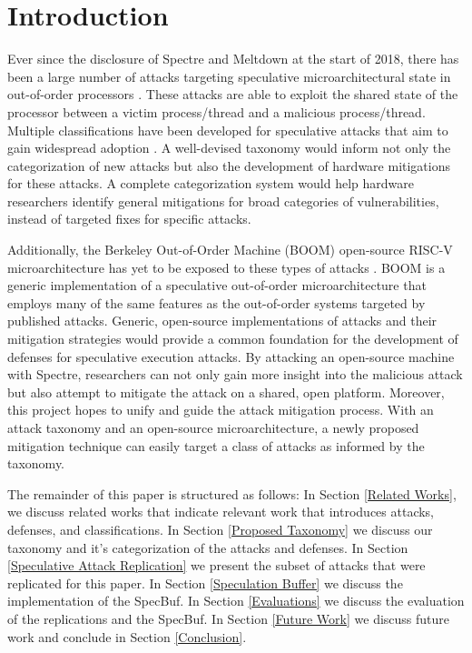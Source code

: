 \section{Introduction}

Ever since the disclosure of Spectre and Meltdown at the start of 2018, there has
been a large number of attacks targeting speculative microarchitectural state in
out-of-order processors \cite{b1,b2}. These attacks are able to exploit the shared
state of the processor between a victim process/thread and a malicious process/thread.
Multiple classifications have been developed for speculative attacks 
that aim to gain widespread adoption \cite{b5,b6,b7,b9,b10}.
A well-devised taxonomy would inform not only the 
categorization of new attacks but also the development of hardware mitigations for 
these attacks. A complete categorization system would help hardware researchers 
identify general mitigations for broad categories of vulnerabilities, instead of 
targeted fixes for specific attacks.

Additionally, the Berkeley Out-of-Order Machine (BOOM) open-source RISC-V
microarchitecture has yet to be exposed to these types of attacks \cite{b11}. BOOM
is a generic implementation of a speculative 
out-of-order microarchitecture that employs many of the same features as the 
out-of-order systems targeted by published attacks. Generic, open-source 
implementations of attacks and their mitigation strategies would provide a common 
foundation for the development of defenses for speculative execution attacks.
By attacking an open-source machine with Spectre, researchers can not only gain more 
insight into the malicious attack but also attempt to mitigate the attack on a shared,
open platform. Moreover, this project hopes to unify and guide the attack 
mitigation process. With an attack taxonomy and an open-source microarchitecture, a 
newly proposed mitigation technique can easily target a class of attacks as informed 
by the taxonomy.

The remainder of this paper is structured as follows: In Section \ref{Related Works}, we discuss
related works that indicate relevant work that introduces attacks, defenses, and classifications.
In Section \ref{Proposed Taxonomy} we discuss our taxonomy and it's categorization of the attacks and defenses. In
Section \ref{Speculative Attack Replication} we present the subset of attacks that were replicated for this paper. In Section \ref{Speculation Buffer}
we discuss the implementation of the SpecBuf. In Section \ref{Evaluations} we discuss the evaluation of the
replications and the SpecBuf. In Section \ref{Future Work} we discuss future work and conclude in Section \ref{Conclusion}.
